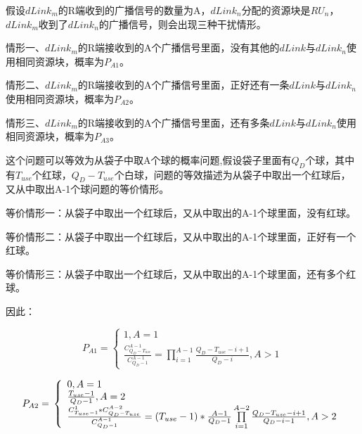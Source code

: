 \documentclass[figurelist,tablelist,algorithmlist,nomlist,masters]{seuthesix}
\begin{document}
	假设$dLink_m$的R端收到的广播信号的数量为A，$dLink_n$分配的资源块是$RU_n$，$dLink_m$收到了$dLink_n$的广播信号，则会出现三种干扰情形。

	情形一、$dLink_m$的R端接收到的A个广播信号里面，没有其他的$dLink$与$dLink_n$使用相同资源块，概率为$P_{A1}$。

	情形二、$dLink_m$的R端接收到的A个广播信号里面，正好还有一条$dLink$与$dLink_n$使用相同资源块，概率为$P_{A2}$。

	情形三、$dLink_m$的R端接收到的A个广播信号里面，还有多条$dLink$与$dLink_n$使用相同资源块，概率为$P_{A3}$。

	这个问题可以等效为从袋子中取A个球的概率问题,假设袋子里面有$Q_D$个球，其中有$T_{use}$个红球，$Q_D - T_{use}$个白球，问题的等效描述为从袋子中取出一个红球后，又从中取出A-1个球问题的等价情形。

	等价情形一：从袋子中取出一个红球后，又从中取出的A-1个球里面，没有红球。

	等价情形二：从袋子中取出一个红球后，又从中取出的A-1个球里面，正好有一个红球。

	等价情形三：从袋子中取出一个红球后，又从中取出的A-1个球里面，还有多个红球。

	因此：



	\begin{equation}\label{eq3.1}
	{P_{A1}} = \left\{ \begin{array}{l}
	1,A = 1\\
	\frac{{C_{{Q_D} - {T_{use}}}^{A - 1}}}{{C_{{Q_D} - 1}^{A - 1}}} = \prod\limits_{i = 1}^{A - 1} {\frac{{{Q_D} - {T_{use}} - i + 1}}{{{Q_D} - i}},A > 1}
	\end{array} \right.
	\end{equation}

	\begin{equation}\label{eq3.1}
	{P_{A2}} = {\rm{ }}\left\{ \begin{array}{l}
	0,A = 1\\
	\frac{{{T_{use}} - 1}}{{{Q_D} - 1}},A = 2\\
	\frac{{C_{{T_{use}} - 1}^1*C_{{Q_D} - {T_{use}}}^{A - 2}}}{{C_{{Q_D} - 1}^{A - 1}}} = ({T_{use}} - 1)*\frac{{A - 1}}{{{Q_D} - 1}}\prod\limits_{i = 1}^{A - 2} {\frac{{{Q_D} - {T_{use}} - i + 1}}{{{Q_D} - i - 1}},A > 2}
	\end{array} \right.
	\end{equation}
\end{document}
